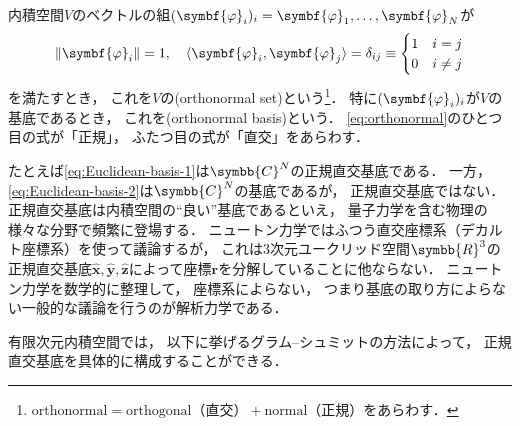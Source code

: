 \documentclass[
]{sotsu}
\newcommand{\bphi}{\symbf{\varphi}}
\begin{document}
\quad 
内積空間$V$のベクトルの組$\sequ{\bphi_i}[i] = \bphi_1, \dots, \bphi_N$が
\begin{equation}
    \label{eq:orthonormal}
    \norm{\bphi_i} = 1, 
    \quad
    \iparen{\bphi_i, \bphi_j} = 
    \kdelta_{ij} \equiv
    \begin{cases}
        1  &  i = j  \\
        0  &  i \neq j
    \end{cases}
\end{equation}
を満たすとき，
これを$V$の(orthonormal set)という\footnote{
    $\text{orthonormal} = \text{orthogonal（直交）} + \text{normal（正規）}$をあらわす．
}．
特に$\sequ{\bphi_i}[i]$が$V$の基底であるとき，
これを(orthonormal basis)という．
\cref{eq:orthonormal}のひとつ目の式が「正規」，
ふたつ目の式が「直交」をあらわす．

たとえば\cref{eq:Euclidean-basis-1}は$\symbb{C}^N$の正規直交基底である．
一方，\cref{eq:Euclidean-basis-2}は$\symbb{C}^N$の基底であるが，
正規直交基底ではない．
正規直交基底は内積空間の``良い''基底であるといえ，
量子力学を含む物理の様々な分野で頻繁に登場する．
ニュートン力学ではふつう直交座標系（デカルト座標系）を使って議論するが，
これは3次元ユークリッド空間$\symbb{R}^3$の正規直交基底$\hat{\symbf{x}}, \hat{\symbf{y}}, \hat{\symbf{z}}$によって座標$\symbf{r}$を分解していることに他ならない．
ニュートン力学を数学的に整理して，
座標系によらない，
つまり基底の取り方によらない一般的な議論を行うのが解析力学である．



\quad
有限次元内積空間では，
以下に挙げるグラム--シュミットの方法によって，
正規直交基底を具体的に構成することができる．
\end{document}
